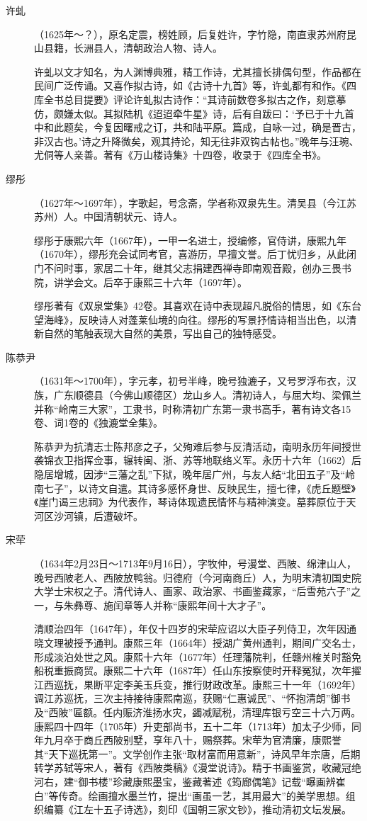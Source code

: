 \begin{description}
  \item[许虬] （1625年～？），原名定震，榜姓顾，后复姓许，字竹隐，南直隶苏州府昆山县籍，长洲县人，清朝政治人物、诗人。\par
        许虬以文才知名，为人渊博典雅，精工作诗，尤其擅长排偶句型，作品都在民间广泛传诵。又喜作拟古诗，如《古诗十九首》等，许虬都有和作。《四库全书总目提要》评论许虬拟古诗作：“其诗前数卷多拟古之作，刻意摹仿，颇嫌太似。其拟陆机《迢迢牵牛星》诗，后有自跋曰：‘予已于十九首中和此题矣，今复因曙戒之订，共和陆平原。篇成，自咏一过，确是晋古，非汉古也。’诗之升降微矣，观其持论，知无往非双钩古帖也。”晚年与汪琬、尤侗等人亲善。著有《万山楼诗集》十四卷，收录于《四库全书》。
  \item[缪彤] （1627年～1697年），字歌起，号念斋，学者称双泉先生。清吴县（今江苏苏州）人。中国清朝状元、诗人。\par
        缪彤于康熙六年（1667年），一甲一名进士，授编修，官侍讲，康熙九年（1670年），缪彤充会试同考官，喜游历，早擅文誉。后丁忧归乡，从此闭门不问时事，家居二十年，继其父志捐建西禅寺即南观音殿，创办三畏书院，讲学会文。后卒于康熙三十六年（1697年）。\par
        缪彤著有《双泉堂集》42卷。其喜欢在诗中表现超凡脱俗的情思，如《东台望海峰》，反映诗人对蓬莱仙境的向往。缪彤的写景抒情诗相当出色，以清新自然的笔触表现大自然的美景，写出自己的独特感受。
  \item[陈恭尹] （1631年～1700年），字元孝，初号半峰，晚号独漉子，又号罗浮布衣，汉族，广东顺德县（今佛山顺德区）龙山乡人。清初诗人，与屈大均、梁佩兰并称“岭南三大家”，工隶书，时称清初广东第一隶书高手，著有诗文各15卷、词1卷的《独漉堂全集》。\par
        陈恭尹为抗清志士陈邦彦之子，父殉难后参与反清活动，南明永历年间授世袭锦衣卫指挥佥事，辗转闽、浙、苏等地联络义军。永历十六年（1662）后隐居增城，因涉“三藩之乱”下狱，晚年居广州，与友人结“北田五子”及“岭南七子”，以诗文自遣。其诗多感怀身世、反映民生，擅七律，《虎丘题壁》《崖门谒三忠祠》为代表作，琴诗体现遗民情怀与精神演变。墓葬原位于天河区沙河镇，后遭破坏。
  \item[宋荦] （1634年2月23日～1713年9月16日），字牧仲，号漫堂、西陂、绵津山人，晚号西陂老人、西陂放鸭翁。归德府（今河南商丘）人，为明末清初国史院大学士宋权之子。清代诗人、画家、政治家、书画鉴藏家，“后雪苑六子”之一，与朱彝尊、施闰章等人并称“康熙年间十大才子”。\par
        清顺治四年（1647年），年仅十四岁的宋荦应诏以大臣子列侍卫，次年因通晓文理被授予通判。康熙三年（1664年）授湖广黄州通判，期间广交名士，形成淡泊处世之风。康熙十六年（1677年）任理藩院判，任赣州榷关时豁免船税重振商贸。康熙二十六年（1687年）任山东按察使时开释冤狱，次年擢江西巡抚，果断平定李美玉兵变，推行财政改革。康熙三十一年（1692年）调江苏巡抚，三次主持接待康熙南巡，获赐“仁惠诚民”、“怀抱清朗”御书及“西陂”匾额。任内赈济淮扬水灾，蠲减赋税，清理库银亏空三十六万两。康熙四十四年（1705年）升吏部尚书，五十二年（1713年）加太子少师，同年九月卒于商丘西陂别墅，享年八十，赐祭葬。宋荦为官清廉，康熙誉其“天下巡抚第一”。文学创作主张“取材富而用意新”，诗风早年宗唐，后期转学苏轼等宋人，著有《西陂类稿》《漫堂说诗》。精于书画鉴赏，收藏冠绝河右，建“御书楼”珍藏康熙墨宝，鉴藏著述《筠廊偶笔》记载“曝画辨崔白”等传奇。绘画擅水墨兰竹，提出“画虽一艺，其用最大”的美学思想。组织编纂《江左十五子诗选》，刻印《国朝三家文钞》，推动清初文坛发展。

\end{description}
